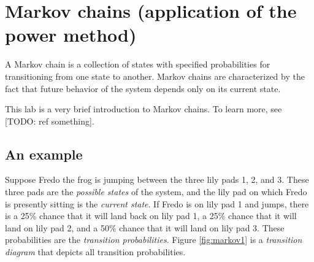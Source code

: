 \section*{Markov chains (application of the power method)}
A Markov chain is a collection of states with specified probabilities for transitioning from one state to another.
Markov chains are characterized by the fact that future behavior of the system depends only on its current state.

This lab is a very brief introduction to Markov chains. To learn more, see [TODO: ref something].

\subsection*{An example}
Suppose Fredo the frog is jumping between the three lily pads 1, 2, and 3.
These three pads are the \emph{possible states} of the system, and the lily pad on which Fredo is presently sitting is the \emph{current state}.
If Fredo is on lily pad 1 and jumps, there is a 25\% chance that it will land back on lily pad 1, a 25\% chance that it will land on lily pad 2, and a 50\% chance that it will land on lily pad 3.
These probabilities are the \emph{transition probabilities}.
Figure \ref{fig:markov1} is a \emph{transition diagram} that depicts all transition probabilities.

